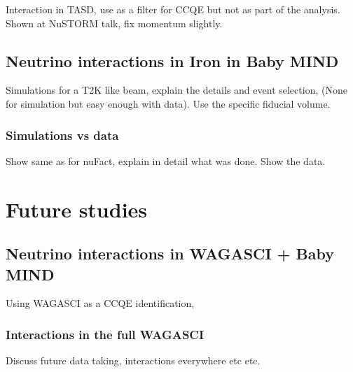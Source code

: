 Interaction in TASD, use as a filter for CCQE but not as part of the analysis. Shown at NuSTORM talk, fix momentum slightly.

\subsection{Neutrino interactions in Iron in Baby MIND}
Simulations for a  T2K like beam, explain the details and event selection, (None for simulation but easy enough with data). Use the specific fiducial volume.

\subsubsection{Simulations vs data}
Show same as for nuFact, explain in detail what was done. Show the data.


\section{Future studies}

\subsection{Neutrino interactions in WAGASCI + Baby MIND}

Using WAGASCI as a CCQE identification,

\subsubsection{Interactions in the full WAGASCI}

Discuss future data taking, interactions everywhere etc etc.



